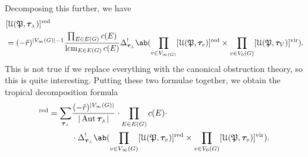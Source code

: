 \documentclass[10pt]{amsart}
\theoremstyle{definition}
\theoremstyle{remark}
\theoremstyle{plain}
\theoremstyle{definition}
\theoremstyle{remark}
\newcommand{\mc}[1]{\mathcal{#1}}
\newcommand{\mf}[1]{\mathfrak{#1}}
\newcommand{\btau}{\bm{\tau}}
\newcommand{\mr}[1]{\mathrm{#1}}
\newcommand{\on}[1]{\operatorname{#1}}
\newcommand{\1}{\mathbf{1}}
\newcommand{\2}{\mathbf{2}}
\newcommand{\3}{\mathbf{3}}
\newcommand{\vir}{\mr{vir}}
\newcommand{\red}{\mr{red}}
\DeclareMathOperator{\Aut}{Aut}
\begin{document}
Decomposing this further, we have
\begin{align*}
    &[\mc{U}(\mf{P}, \btau_{\curlywedge})]^{\on{red}} \\ 
    &= (-\tilde{r})^{|V_{\infty}(G)|-1} \frac{\prod_{E \in E(G)} c(E)}{\on{lcm}_{E \in E(G)} c(E)} \Delta^!_{\btau_{\curlywedge}} \ab(\prod_{v \in V_{\infty(G)}} [\mc{U}(\mf{P}, \btau_v)]^{\on{red}} \times \prod_{v \in V_0(G)} [\mc{U}(\mf{P}, \btau_V)]^{\vir}). 
\end{align*}
This is not true if we replace everything with the canonical obstruction theory, so this is quite interesting. Putting these two formulae together, we obtain the tropical decomposition formula
\begin{align*}
    [\mc{U}_{g, \vec{c}}(\mf{P}, \beta)]^{\on{red}} = \sum_{\btau_{\curlywedge}} & \frac{(-\tilde{r})^{|V_{\infty}(G)|}}{|\Aut \btau_{\curlywedge}|} \cdot \prod_{E \in E(G)} c(E) \cdot \\
    & \cdot \Delta_{\btau_{\curlywedge}}^! \ab( \prod_{v \in V_{\infty}(G)}[\mc{U}(\mf{P},\btau_{v})]^{\red} \times \prod_{v \in V_0(G)} [\mc{U}(\mf{P},\btau_v)]^{\vir}).
\end{align*}
\end{document}

